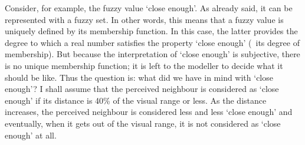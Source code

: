 Consider, for example, the fuzzy value `close enough'. As already said, it can be represented with a fuzzy set. In other words, this means that a fuzzy value is uniquely defined by its membership function. In this case, the latter provides the degree to which a real number satisfies the property `close enough' (\ie\ its degree of membership). But because the interpretation of `close enough' is subjective, there is no unique membership function; it is left to the modeller to decide what it should be like. Thus the question is: what did we have in mind with `close enough'? I shall assume that the perceived neighbour is considered as `close enough' if its distance is 40\% of the visual range or less. As the distance increases, the perceived neighbour is considered less and less `close enough' and eventually, when it gets out of the visual range, it is not considered as `close enough' at all. 
%
